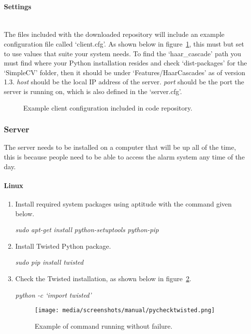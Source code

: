 \documentclass[12pt,a4paper]{report}
\begin{document}
        \paragraph{Settings}\mbox{}\\
            The files included with the downloaded repository will include an example configuration file called `client.cfg'. As shown
            below in figure~\ref{lst:clientcfg}, this must but set to use values that suite your system needs. To find the `haar\_cascade'
            path you must find where your Python installation resides and check `dist-packages' for the `SimpleCV' folder, then it should
            be under `Features/HaarCascades' as of version 1.3. \newline
            \textit{host} should be the local IP address of the server. \newline
            \textit{port} should be the port the server is running on, which is also defined in the `server.cfg'.

            \begin{figure}[H]
                \centering
                \caption{Example client configuration included in code repository.}
                \label{lst:clientcfg}
                    
            \end{figure}

    \subsubsection{Server}
        The server needs to be installed on a computer that will be up all of the time, this is because people need to be able to access
        the alarm system any time of the day.

        \paragraph{Linux}

        \begin{enumerate}
            \item Install required system packages using aptitude with the command given below.

            \textit{sudo apt-get install python-setuptools python-pip}

            \item Install Twisted Python package.

            \textit{sudo pip install twisted}

            \item Check the Twisted installation, as shown below in figure~\ref{fig:twistedcheck}.

            \textit{python -c `import twisted'}
            \begin{figure}[H]
                \centering
                \caption{Example of command running without failure.}
                \label{fig:twistedcheck}
                    \texttt{[image: media/screenshots/manual/pychecktwisted.png]}
            \end{figure}
        \end{enumerate}
\end{document}
